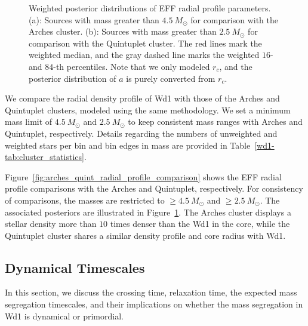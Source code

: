 \documentclass[12pt]{ucsddissertation}
\begin{document}
\begin{CJK*}{UTF8}{gbsn}
\begin{figure}
    \centering
    \caption[Posteriors of radial profile comparisons]{Weighted posterior distributions of EFF radial profile parameters. (a): Sources with mass greater than $4.5~M_\odot$ for comparison with the Arches cluster. (b): Sources with mass greater than $2.5~M_\odot$ for comparison with the Quintuplet cluster. The red lines mark the weighted median, and the gray dashed line marks the weighted $16$- and $84$-th percentiles. Note that we only modeled $r_c$, and the posterior distribution of $a$ is purely converted from $r_c$.}
    \label{fig:radial_profile_posteriors_arches_quint}
\end{figure}

We compare the radial density profile of Wd1 with those of the Arches and Quintuplet clusters, modeled using the same methodology. We set a minimum mass limit of $4.5~M_\odot$ and $2.5~M_\odot$ to keep consistent mass ranges with Arches and Quintuplet, respectively. Details regarding the numbers of unweighted and weighted stars per bin and bin edges in mass are provided in Table~\ref{wd1-tab:cluster_statistics}.

Figure~\ref{fig:arches_quint_radial_profile_comparison} shows the EFF radial profile comparisons with the Arches and Quintuplet, respectively. For consistency of comparisons, the masses are restricted to $\geq4.5~M_\odot$ and $\geq2.5~M_\odot$. The associated posteriors are illustrated in Figure~\ref{fig:radial_profile_posteriors_arches_quint}. The Arches cluster displays a stellar density more than $10$ times denser than the Wd1 in the core, while the Quintuplet cluster shares a similar density profile and core radius with Wd1.


\subsection{Dynamical Timescales}
\label{wd1-subsec:timescales}
In this section, we discuss the crossing time, relaxation time, the expected mass segregation timescales, and their implications on whether the mass segregation in Wd1 is dynamical or primordial. 


\end{CJK*}
\end{document}

